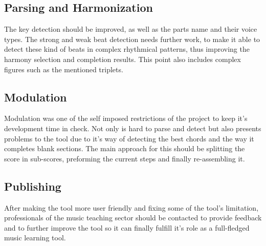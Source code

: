   \subsection{Parsing and Harmonization}
  \label{subsec:parsing_harm}
  The key detection should be improved, as well as the parts name and their voice types. The strong and weak beat detection needs further work, to make it able to detect these kind of beats in complex rhythmical patterns, thus improving the harmony selection and completion results. This point also includes complex figures such as the mentioned triplets.
  
  \subsection{Modulation}
  \label{subsec:future_modulation}
  Modulation was one of the self imposed restrictions of the project to keep it's development time in check. Not only is hard to parse and detect but also presents problems to the tool due to it's way of detecting the best chords and the way it completes blank sections. The main approach for this should be splitting the score in sub-scores, preforming the current steps and finally re-assembling it.
  
  \subsection{Publishing}
  \label{subsec:releasing}
  After making the tool more user friendly and fixing some of the tool's limitation, professionals of the music teaching sector should be contacted to provide feedback and to further improve the tool so it can finally fulfill it's role as a full-fledged music learning tool.

